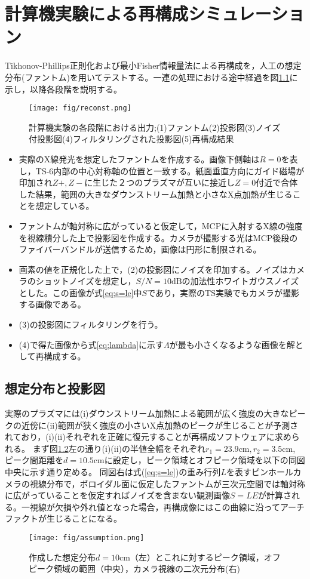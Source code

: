 \chapter{計算機実験による再構成シミュレーション}
Tikhonov-Phillips正則化および最小Fisher情報量法による再構成を，人工の想定分布(ファントム)を用いてテストする。一連の処理における途中経過を図\ref{fig:reconst}に示し，以降各段階を説明する。
\begin{figure}[H]
	 \centering
	 \texttt{[image: fig/reconst.png]}
	 \caption{計算機実験の各段階における出力;(1)ファントム(2)投影図(3)ノイズ付投影図(4)フィルタリングされた投影図(5)再構成結果}
	 \label{fig:reconst}
\end{figure}
\begin{itemize}
	\item [(1)]実際のX線発光を想定したファントムを作成する。画像下側軸は$R=0$を表し，TS-6内部の中心対称軸の位置と一致する。紙面垂直方向にガイド磁場が印加され$Z+, Z-$に生じた２つのプラズマが互いに接近し$Z=0$付近で合体した結果，範囲の大きなダウンストリーム加熱と小さなX点加熱が生じることを想定している。
	\item [(2)]ファントムが軸対称に広がっていると仮定して，MCPに入射するX線の強度を視線積分した上で投影図を作成する。カメラが撮影する光はMCP後段のファイバーバンドルが送信するため，画像は円形に制限される。
	\item [(3)]画素の値を正規化した上で，(2)の投影図にノイズを印加する。ノイズはカメラのショットノイズを想定し，$S/N = 10\mathrm{dB}$の加法性ホワイトガウスノイズとした。この画像が式\ref{eq;s=le}中$S$であり，実際のTS実験でもカメラが撮影する画像である。
	\item [(4)](3)の投影図にフィルタリングを行う。
	\item [(5)](4)で得た画像から式\ref{eq;lambda}に示す$\Lambda$が最も小さくなるような画像を解として再構成する。
\end{itemize}
\section{想定分布と投影図}
実際のプラズマには(i)ダウンストリーム加熱による範囲が広く強度の大きなピークの近傍に(ii)範囲が狭く強度の小さいX点加熱のピークが生じることが予測されており，(i)(ii)それぞれを正確に復元することが再構成ソフトウェアに求められる。
まず図\ref{fig:assumption}左の通り(i)(ii)の半値全幅をそれぞれ$r_1 = 23.9\mathrm{cm}, r_2 = 3.5\mathrm{cm}$, ピーク間距離を$d = 10.5\mathrm{cm}$に設定し，ピーク領域とオフピーク領域を以下の同図中央に示す通り定める。
同図右は式(\ref{eq;s=le})の重み行列$L$を表すピンホールカメラの視線分布で，ポロイダル面に仮定したファントムが三次元空間では軸対称に広がっていることを仮定すればノイズを含まない観測画像$S = LE$が計算される。一視線が欠損や外れ値となった場合，再構成像にはこの曲線に沿ってアーチファクトが生じることになる。
\begin{figure}[H]
	\centering
	\texttt{[image: fig/assumption.png]}
	\caption{作成した想定分布$d = 10\mathrm{cm}$（左）とこれに対するピーク領域，オフピーク領域の範囲（中央），カメラ視線の二次元分布(右)}
	\label{fig:assumption}
\end{figure}

